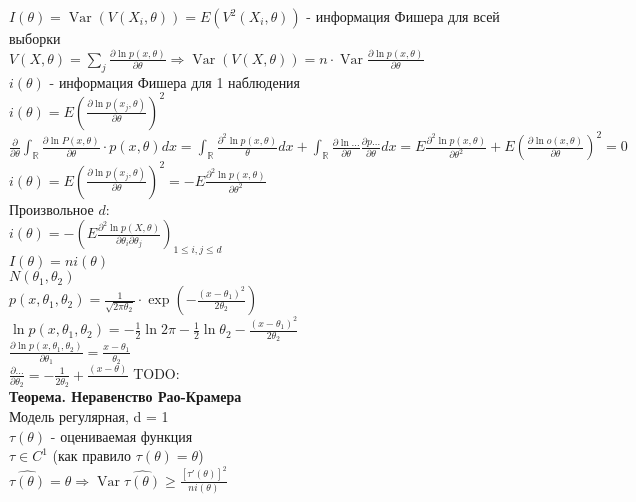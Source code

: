 \documentclass{article}
\newcommand\0{\mathbb{0}}
\DeclareMathOperator{\Var}{Var}
\newcommand\1{\mathbb{1}}
\begin{document}
$I(\theta) = \Var(V(X_i, \theta)) = E(V^2(X_i, \theta))$ - информация Фишера для всей выборки\\
$V(X, \theta) = \displaystyle\sum_j \frac{\partial \ln{p(x, \theta)}}{\partial \theta} \Rightarrow \Var(V(X, \theta)) = n \cdot \Var \frac{\partial \ln{p(x, \theta)}}{\partial \theta}$\\
$i(\theta)$ - информация Фишера для 1 наблюдения\\
$i(\theta) = E(\frac{\partial \ln{p(x_j, \theta)}}{\partial \theta})^2$\\
$\frac{\partial}{\partial \theta} \displaystyle\int_\mathbb{R} \frac{\partial \ln{P(x, \theta)}}{\partial \theta} \cdot p(x, \theta) dx = \displaystyle\int_\mathbb{R} \frac{\partial^2 \ln{p(x, \theta)}}{\theta} dx + \displaystyle\int_\mathbb{R} \frac{\partial \ln{\dots}}{\partial \theta} \frac{\partial p \dots}{\partial \theta} dx = E \frac{\partial^2 \ln{p(x, \theta)}}{\partial \theta^2} + E(\frac{\partial \ln{o(x, \theta)}}{\partial \theta})^2 = 0$\\
$i(\theta) = E(\frac{\partial \ln{p(x_j, \theta)}}{\partial \theta})^2 = -E\frac{\partial^2 \ln{p(x, \theta)}}{\partial \theta^2}$\\
Произвольное $d$:\\
$i(\theta) = -(E\frac{\partial^2 \ln{p(X, \theta)}}{\partial \theta_i \partial \theta_j})_{1 \leq i, j \leq d}$\\
$I(\theta) = n i(\theta)$\\
$N(\theta_1, \theta_2)$\\
$p(x, \theta_1, \theta_2) = \frac{1}{\sqrt{2\pi \theta_2}} \cdot \exp(-\frac{(x - \theta_1)^2}{2\theta_2})$\\
$\ln{p(x, \theta_1, \theta_2)} = -\frac{1}{2} \ln{2\pi} - \frac{1}{2}\ln{\theta_2} - \frac{(x - \theta_1)^2}{2\theta_2}$\\
$\frac{\partial \ln{p(x, \theta_1, \theta_2)}}{\partial \theta_1} = \frac{x - \theta_1}{\theta_2}$\\
$\frac{\partial \dots}{\partial \theta_2} = - \frac{1}{2 \theta_2} + \frac{(x - \theta)}{}$
TODO:\\
\textbf{Теорема. Неравенство Рао-Крамера}\\
Модель регулярная, d = 1\\
$\tau(\theta)$ - оцениваемая функция\\
$\tau \in C^1$ (как правило $\tau(\theta) = \theta$)\\
$\widehat{\tau(\theta)} = \theta \Rightarrow \Var \widehat{\tau(\theta)} \geq \frac{[\tau'(\theta)]^2}{n i(\theta)}$\\
\end{document}
